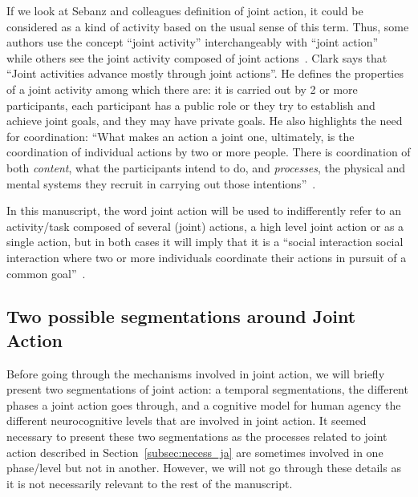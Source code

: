 \documentclass[a4paper,11pt,twoside]{StyleThese}
\begin{document}
If we look at Sebanz and colleagues definition of joint action, it could be considered as a kind of activity based on the usual sense of this term. Thus, some authors use the concept ``joint activity'' interchangeably with ``joint action''~\cite{tollefsen_2005_let,grafenhain_2013_three} while others see the joint activity composed of joint actions~\cite{clark_1996_using, feltovitch_2005_common}. Clark says that ``Joint activities advance mostly through joint actions''. He defines the properties of a joint activity among which there are: it is carried out by 2 or more participants, each participant has a public role or they try to establish and achieve joint goals, and they may have private goals. He also highlights the need for coordination: ``What makes an action a joint one, ultimately, is the coordination of individual actions by two or more people. There is coordination of both \textit{content}, what the participants intend to do, and \textit{processes}, the physical and mental systems they recruit in carrying out those intentions''~\cite[p~.59]{clark_1996_using}. 

In this manuscript, the word joint action will be used to indifferently refer to an activity/task composed of several (joint) actions, \ie a high level joint action or as a single action, but in both cases it will imply that it is a ``social interaction social interaction where two or more individuals coordinate their actions in pursuit of a common goal''~\cite{castro_2020_joint}.

\subsection{Two possible segmentations around Joint Action}

Before going through the mechanisms involved in joint action, we will briefly present two segmentations of joint action: a temporal segmentations, \ie the different phases a joint action goes through, and a cognitive model for human agency \ie the different neurocognitive levels that are involved in joint action. It seemed necessary to present these two segmentations as the processes related to joint action described in Section~\ref{subsec:necess_ja} are sometimes involved in one phase/level but not in another. However, we will not go through these details as it is not necessarily relevant to the rest of the manuscript.
\end{document}
